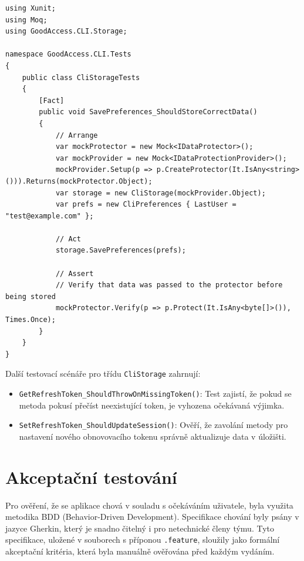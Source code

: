 \noindent\begin{minipage}{\linewidth}
\begin{lstlisting}[language=CSharp, stringstyle=\itshape, caption={Ukázka jednotkového testu v .NET pomocí xUnit a Moq}, label={lst:xunit_test}]
using Xunit;
using Moq;
using GoodAccess.CLI.Storage;

namespace GoodAccess.CLI.Tests
{
    public class CliStorageTests
    {
        [Fact]
        public void SavePreferences_ShouldStoreCorrectData()
        {
            // Arrange
            var mockProtector = new Mock<IDataProtector>();
            var mockProvider = new Mock<IDataProtectionProvider>();
            mockProvider.Setup(p => p.CreateProtector(It.IsAny<string>())).Returns(mockProtector.Object);
            var storage = new CliStorage(mockProvider.Object);
            var prefs = new CliPreferences { LastUser = "test@example.com" };

            // Act
            storage.SavePreferences(prefs);

            // Assert
            // Verify that data was passed to the protector before being stored
            mockProtector.Verify(p => p.Protect(It.IsAny<byte[]>()), Times.Once);
        }
    }
}
\end{lstlisting}
\end{minipage}

Další testovací scénáře pro třídu \texttt{CliStorage} zahrnují:
\begin{itemize}
    \item \texttt{GetRefreshToken\_\allowbreak{}ShouldThrowOnMissingToken()}: Test zajistí, že pokud se metoda pokusí přečíst neexistující token, je vyhozena očekávaná výjimka.
    \item \texttt{SetRefreshToken\_\allowbreak{}ShouldUpdateSession()}: Ověří, že zavolání metody pro nastavení nového obnovovacího tokenu správně aktualizuje data v úložišti.
\end{itemize}

\section{Akceptační testování}
\label{sec:acceptance_testing}

Pro ověření, že se aplikace chová v souladu s očekáváním uživatele, byla využita metodika BDD (Behavior-Driven Development). Specifikace chování byly psány v jazyce Gherkin, který je snadno čitelný i pro netechnické členy týmu. Tyto specifikace, uložené v souborech s příponou \texttt{.feature}, sloužily jako formální akceptační kritéria, která byla manuálně ověřována před každým vydáním.

